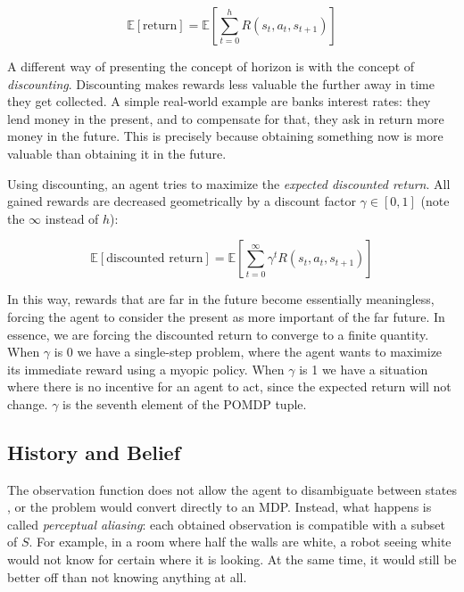 
\[ \mathbb{E}[\text{return}] = \mathbb{E} \left [ \sum_{t=0}^{h} R(s_t, a_t, s_{t+1}) \right ] \]

A different way of presenting the concept of horizon is with the concept of \textit{discounting}.
Discounting makes rewards less valuable the further away in time they get collected. A simple
real-world example are banks interest rates: they lend money in the present, and to compensate for
that, they ask in return more money in the future. This is precisely because obtaining something now
is more valuable than obtaining it in the future.

Using discounting, an agent tries to maximize the \textit{expected discounted return}. All gained rewards are
decreased geometrically by a discount factor $\gamma \in [0,1]$ (note the $\infty$ instead of $h$):

\[ \mathbb{E}[\text{discounted return}] = \mathbb{E} \left [ \sum_{t=0}^{\infty} \gamma^t R(s_t,
a_t, s_{t+1}) \right ] \]

In this way, rewards that are far in the future become essentially meaningless, forcing the agent to
consider the present as more important of the far future. In essence, we are forcing the discounted
return to converge to a finite quantity. When $\gamma$ is 0 we have a single-step problem, where the
agent wants to maximize its immediate reward using a myopic policy. When $\gamma$ is 1 we
have a situation where there is no incentive for an agent to act, since the expected return will not
change. $\gamma$ is the seventh element of the POMDP tuple.

\subsection{History and Belief}

The observation function does not allow the agent to disambiguate between states , or the problem
would convert directly to an MDP. Instead, what happens is called \textit{perceptual aliasing}: each
obtained observation is compatible with a subset of $S$. For example, in a room where half the walls
are white, a robot seeing white would not know for certain where it is looking. At the same time, it
would still be better off than not knowing anything at all.

